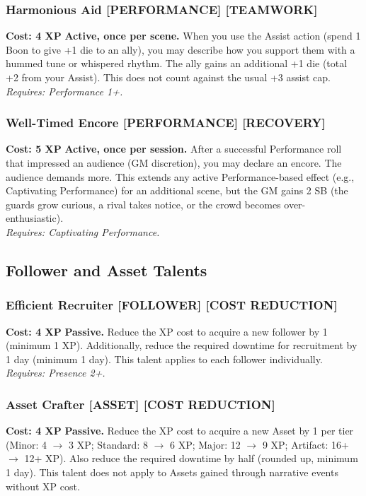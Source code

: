 \subsubsection*{Harmonious Aid \textnormal{[PERFORMANCE] [TEAMWORK]}}
\label{talent:harmonious-aid}
\textbf{Cost: 4 XP} \textbf{Active, once per scene.} When you use the Assist action (spend 1 Boon to give +1 die to an ally), you may describe how you support them with a hummed tune or whispered rhythm. The ally gains an additional +1 die (total +2 from your Assist). This does not count against the usual +3 assist cap. \\
\textit{Requires: Performance 1+.}

\subsubsection*{Well-Timed Encore \textnormal{[PERFORMANCE] [RECOVERY]}}
\label{talent:well-timed-encore}
\textbf{Cost: 5 XP} \textbf{Active, once per session.} After a successful Performance roll that impressed an audience (GM discretion), you may declare an encore. The audience demands more. This extends any active Performance-based effect (e.g., Captivating Performance) for an additional scene, but the GM gains 2 SB (the guards grow curious, a rival takes notice, or the crowd becomes over-enthusiastic). \\
\textit{Requires: Captivating Performance.}

\subsection*{Follower and Asset Talents}
\label{sec:major-follower-asset}

\subsubsection*{Efficient Recruiter \textnormal{[FOLLOWER] [COST REDUCTION]}}
\label{talent:efficient-recruiter}
\textbf{Cost: 4 XP} \textbf{Passive.} Reduce the XP cost to acquire a new follower by 1 (minimum 1 XP). Additionally, reduce the required downtime for recruitment by 1 day (minimum 1 day). This talent applies to each follower individually. \\
\textit{Requires: Presence 2+.}

\subsubsection*{Asset Crafter \textnormal{[ASSET] [COST REDUCTION]}}
\label{talent:asset-crafter}
\textbf{Cost: 4 XP} \textbf{Passive.} Reduce the XP cost to acquire a new Asset by 1 per tier (Minor: 4 $\rightarrow$ 3 XP; Standard: 8 $\rightarrow$ 6 XP; Major: 12 $\rightarrow$ 9 XP; Artifact: 16+ $\rightarrow$ 12+ XP). Also reduce the required downtime by half (rounded up, minimum 1 day). This talent does not apply to Assets gained through narrative events without XP cost.

